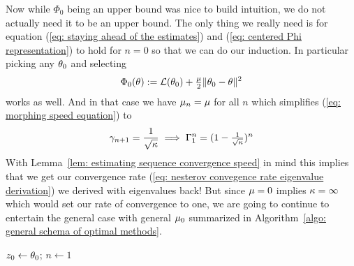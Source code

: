 Now while \(\Phi_0\) being an upper bound was nice to build intuition, we do
not actually need it to be an upper bound. The only thing we really need is
for equation (\ref{eq: staying ahead of the estimates}) and (\ref{eq: centered
Phi representation}) to hold for \(n=0\) so that we can do our induction. In
particular picking any \(\theta_0\) and selecting
\begin{align*}
	\Phi_0(\theta):= \mathcal{L}(\theta_0) + \tfrac{\mu}{2}\|\theta_0 - \theta\|^2
\end{align*}
works as well. And in that case we have \(\mu_n = \mu\) for all \(n\)
which simplifies (\ref{eq: morphing speed equation}) to
\begin{align*}
	\gamma_{n+1} = \frac1{\sqrt{\kappa}} \implies \Gamma_1^n = (1-\tfrac{1}{\sqrt{\kappa}})^n
\end{align*}
With Lemma~\ref{lem: estimating sequence convergence speed} in mind this implies
that we get our convergence rate (\ref{eq: nesterov convegence rate eigenvalue derivation})
we derived with eigenvalues back! But since \(\mu=0\) implies \(\kappa=\infty\)
which would set our rate of convergence to one, we are going to continue
to entertain the general case with general \(\mu_0\) summarized in
Algorithm~\ref{algo: general schema of optimal methods}.

\begin{algorithm}
	\(z_0\leftarrow \theta_0\);
	\(n\leftarrow 1\)\;
	\caption{
		General Schema of Optimal Methods (by \citeauthor{nesterovLecturesConvexOptimization2018})%
		\label{algo: general schema of optimal methods}
	}
\end{algorithm}

